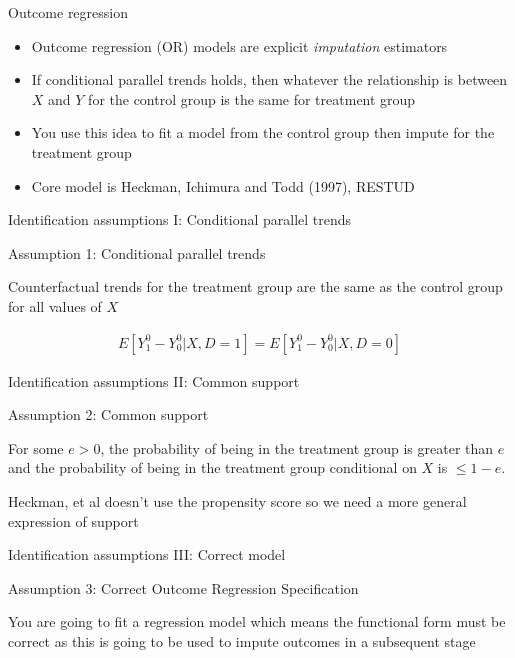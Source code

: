 \documentclass{beamer}
\begin{document}
\begin{frame}{Outcome regression }

\begin{itemize}
\item Outcome regression (OR) models are explicit \emph{imputation} estimators
\item If conditional parallel trends holds, then whatever the relationship is between $X$ and $Y$ for the control group is the same for treatment group
\item You use this idea to fit a model from the control group then impute for the treatment group
\item Core model is Heckman, Ichimura and Todd (1997), RESTUD
\end{itemize}

\end{frame}





\begin{frame}{Identification assumptions I: Conditional parallel trends}

Assumption 1: Conditional parallel trends

\bigskip

Counterfactual trends for the treatment group are the same as the control group for all values of $X$

\begin{eqnarray*}
E[Y_1^0 - Y_0^0 | X, D=1] = E[Y^0_1 - Y^0_0 | X, D=0]
\end{eqnarray*}

\end{frame}

\begin{frame}{Identification assumptions II: Common support}

Assumption 2: Common support

\bigskip

For some $e>0$, the probability of being in the treatment group is greater than $e$ and the probability of being in the treatment group conditional on $X$ is $\leq1-e$.

\bigskip

Heckman, et al doesn't use the propensity score so we need a more general expression of support

\end{frame}

\begin{frame}{Identification assumptions III: Correct model}

Assumption 3: Correct Outcome Regression Specification

\bigskip

You are going to fit a regression model which means the functional form must be correct as this is going to be used to impute outcomes in a subsequent stage

\end{frame}
\end{document}
